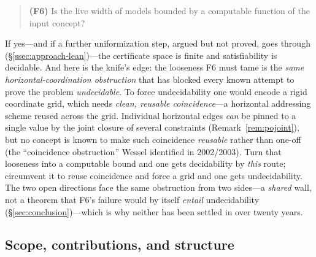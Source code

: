 \documentclass[11pt]{article}
\theoremstyle{plain}
\theoremstyle{definition}
\begin{document}
\begin{quote}
\textbf{(F6)} Is the live width of models bounded by a computable
function of the input concept?
\end{quote}

If yes---and if a further uniformization step, argued but not proved, goes
through (\S\ref{ssec:approach-lean})---the certificate space is finite and
satisfiability is decidable.
And here is the knife's edge: the looseness F6 must tame is the
\emph{same horizontal-coordination obstruction} that has blocked every
known attempt to prove the problem \emph{undecidable}. To force
undecidability one would encode a rigid coordinate grid, which needs
\emph{clean, reusable coincidence}---a horizontal addressing scheme
reused across the grid. Individual horizontal edges \emph{can} be pinned
to a single value by the joint closure of several constraints
(Remark~\ref{rem:pojoint}), but no concept is known to make such
coincidence \emph{reusable} rather than one-off (the ``coincidence
obstruction'' Wessel identified in 2002/2003). Turn that looseness into a
computable bound and one gets decidability by \emph{this} route;
circumvent it to reuse coincidence and force a grid and one gets
undecidability. The two open directions face the same obstruction from
two sides---a \emph{shared} wall, not a theorem that F6's failure would
by itself \emph{entail} undecidability (\S\ref{sec:conclusion})---which
is why neither has been settled in over twenty years.

\subsection{Scope, contributions, and structure}
\label{ssec:scope}
\end{document}
